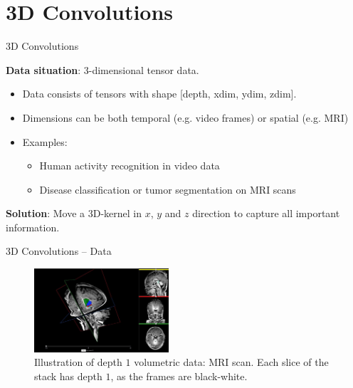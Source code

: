 
\section{3D Convolutions}

\begin{vbframe}{3D Convolutions}

\textbf{Data situation}: 3-dimensional tensor data.

    \begin{itemize}
        \item Data consists of tensors with shape [depth, xdim, ydim, zdim].
        \item Dimensions can be both temporal (e.g. video frames) or spatial (e.g. MRI)
        \item Examples:
        \begin{itemize}
            \item Human activity recognition in video data
            \item Disease classification or tumor segmentation on MRI scans
        \end{itemize}
    \end{itemize}

\textbf{Solution}: Move a 3D-kernel in $x$, $y$ and $z$ direction to capture all important information.

\end{vbframe}
\begin{vbframe}{3D Convolutions -- Data}
    \begin{figure}
        \centering
        \includegraphics[width=5cm]{plots/05_conv_variations/3d/mri.jpg}
        \caption{Illustration of depth $1$ volumetric data: MRI scan. Each slice of the stack has depth $1$, as the frames are black-white.}
    \end{figure}
\end{vbframe}

